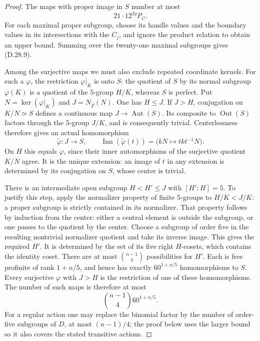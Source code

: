 \begin{proof}
The maps with proper image in $S$ number at most
\[
                         21\cdot12^{2g}P_C.
 \tag{D.28.9}
\]
For each maximal proper subgroup, choose its handle values
and the boundary values in its intersections with the
$C_j$, and ignore the product relation to obtain an upper
bound.  Summing over the twenty-one maximal subgroups
gives \textup{(D.28.9)}.

Among the surjective maps we must also exclude repeated
coordinate kernels.  For such a $\varphi$, the restriction
$\varphi|_K$ is onto $S$: the quotient of $S$ by its
normal subgroup $\varphi(K)$ is a quotient of the
$5$-group $H/K$, whereas $S$ is perfect.
Put $N=\ker(\varphi|_K)$ and
$J=N_{\widehat F}(N)$.  One has $H\leq J$.
If $J>H$, conjugation on $K/N\simeq S$ defines a
continuous map $J\to\operatorname{Aut}(S)$.
Its composite to $\operatorname{Out}(S)$ factors through
the $5$-group $J/K$, and is consequently trivial.
Centerlessness therefore gives an actual homomorphism
\[
 \widetilde\varphi:J\longrightarrow S,
 \qquad
 \operatorname{Inn}(\widetilde\varphi(t))
       =\bigl(kN\longmapsto tkt^{-1}N\bigr).
 \tag{D.28.10}
\]
On $H$ this equals $\varphi$, since their inner
automorphisms of the surjective quotient $K/N$ agree.
It is the unique extension: an image of $t$ in any
extension is determined by its conjugation on $S$,
whose center is trivial.

There is an intermediate open subgroup
$H<H'\leq J$ with $[H':H]=5$.  To justify this step,
apply the normalizer property of finite $5$-groups to
$H/K<J/K$: a proper subgroup is strictly contained in
its normalizer.  That property follows by induction from
the center: either a central element is outside the
subgroup, or one passes to the quotient by the center.
Choose a subgroup of order five in the resulting
nontrivial normalizer quotient and take its inverse
image.  This gives the required $H'$.
It is determined by the set of its five right $H$-cosets,
which contains the identity coset.  There are at most
$\binom{n-1}{4}$ possibilities for $H'$.
Each is free profinite of rank $1+n/5$, and hence has
exactly $60^{1+n/5}$ homomorphisms to $S$.
Every surjective $\varphi$ with $J>H$ is the restriction
of one of these homomorphisms.  The number of such maps
is therefore at most
\[
                    \binom{n-1}{4}60^{1+n/5}.
 \tag{D.28.11}
\]
For a regular action one may replace the binomial factor
by the number of order-five subgroups of $D$, at most
$(n-1)/4$; the proof below uses the larger bound so it
also covers the stated transitive actions.


\end{proof}
